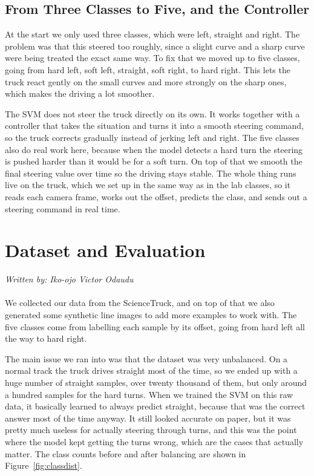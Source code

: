 \documentclass[english]{lni}
\begin{document}
\subsection{From Three Classes to Five, and the Controller}
At the start we only used three classes, which were left, straight and right. The problem was that this steered too roughly, since a slight curve and a sharp curve were being treated the exact same way. To fix that we moved up to five classes, going from hard left, soft left, straight, soft right, to hard right. This lets the truck react gently on the small curves and more strongly on the sharp ones, which makes the driving a lot smoother.

The SVM does not steer the truck directly on its own. It works together with a controller that takes the situation and turns it into a smooth steering command, so the truck corrects gradually instead of jerking left and right. The five classes also do real work here, because when the model detects a hard turn the steering is pushed harder than it would be for a soft turn. On top of that we smooth the final steering value over time so the driving stays stable. The whole thing runs live on the truck, which we set up in the same way as in the lab classes, so it reads each camera frame, works out the offset, predicts the class, and sends out a steering command in real time.

\section{Dataset and Evaluation}
\textit{Written by: Iko-ojo Victor Odaudu}
\\~\\
We collected our data from the ScienceTruck, and on top of that we also generated some synthetic line images to add more examples to work with. The five classes come from labelling each sample by its offset, going from hard left all the way to hard right.

The main issue we ran into was that the dataset was very unbalanced. On a normal track the truck drives straight most of the time, so we ended up with a huge number of straight samples, over twenty thousand of them, but only around a hundred samples for the hard turns. When we trained the SVM on this raw data, it basically learned to always predict straight, because that was the correct answer most of the time anyway. It still looked accurate on paper, but it was pretty much useless for actually steering through turns, and this was the point where the model kept getting the turns wrong, which are the cases that actually matter. The class counts before and after balancing are shown in Figure~\ref{fig:classdist}.
\end{document}
